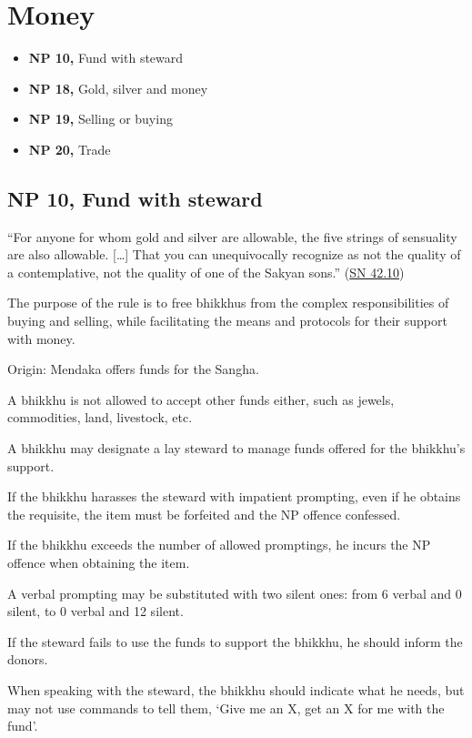 \chapter{Money}

\begin{itemize}
\tightlist
\item
  \textbf{NP 10,} Fund with steward
\item
  \textbf{NP 18,} Gold, silver and money
\item
  \textbf{NP 19,} Selling or buying
\item
  \textbf{NP 20,} Trade
\end{itemize}

\section{NP 10, Fund with steward}

``For anyone for whom gold and silver are allowable, the five strings of
sensuality are also allowable. {[}\ldots{]} That you can unequivocally
recognize as not the quality of a contemplative, not the quality of one
of the Sakyan sons.''
(\href{https://www.dhammatalks.org/suttas/SN/SN42_10.html}{SN 42.10})

The purpose of the rule is to free bhikkhus from the complex
responsibilities of buying and selling, while facilitating the means and
protocols for their support with money.

Origin: Mendaka offers funds for the Sangha.

A bhikkhu is not allowed to accept other funds either, such as jewels,
commodities, land, livestock, etc.

A bhikkhu may designate a lay steward to manage funds offered for the
bhikkhu's support.

If the bhikkhu harasses the steward with impatient prompting, even if he
obtains the requisite, the item must be forfeited and the NP offence
confessed.

If the bhikkhu exceeds the number of allowed promptings, he incurs the
NP offence when obtaining the item.

A verbal prompting may be substituted with two silent ones: from 6
verbal and 0 silent, to 0 verbal and 12 silent.

If the steward fails to use the funds to support the bhikkhu, he should
inform the donors.

When speaking with the steward, the bhikkhu should indicate what he
needs, but may not use commands to tell them, `Give me an X, get an X
for me with the fund'.

